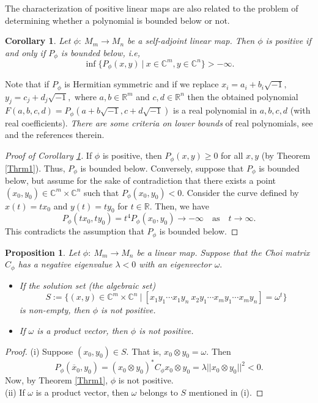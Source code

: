 \documentclass[12pt,a4paper]{amsart}
\theoremstyle{plain}
\newtheorem{corollary}[theorem]{Corollary}
\newtheorem{proposition}[theorem]{Proposition}
\theoremstyle{remark}
\theoremstyle{definition}
\def \R {\mathbb{R}}
\def \C {\mathbb{C}}
\begin{document}
The characterization of positive linear maps are also related to the problem of determining whether a polynomial is bounded below or not. 
\begin{corollary}\label{lowerbound}
	Let $\phi :\ M_m \longrightarrow M_n $ be a self-adjoint linear map. Then $\phi$ is positive if and only if $P_{\phi}$ is bounded below, i.e, 
	$$\inf\{ P_{\phi}(x,y)  \ | \ x\in \C^m, y\in \C^n \} > -\infty. $$
\end{corollary}
Note that if $P_{\phi} $ is Hermitian symmetric and if we replace $x_i= a_i+ b_i\sqrt{-1},$ $y_j=c_j + d_j \sqrt{-1},$ where $a,b \in \R^m$ and $c,d \in \R^n$ then the obtained polynomial $F(a,b,c,d) = P_{\phi}(a+b\sqrt{-1}, c+d \sqrt{-1})$ is a real polynomial in $a,b,c,d$ (with real coefficients). \textit{There are some criteria on lower bounds} of real polynomials, see \cite{Marshall} and the references therein. 
\begin{proof}[Proof of Corollary \ref{lowerbound}]
	If $\phi$ is positive, then $P_{\phi}(x,y) \ge 0$ for all $x, y$ (by Theorem \ref{Thrm1}). Thus, $P_{\phi}$ is bounded below. Conversely, suppose that $P_{\phi}$ is bounded below, but assume for the sake of contradiction that there exists a point $(x_0,y_0) \in \C^m\times \C^n$ such that $P_{\phi}(x_0,y_0) < 0$. Consider the curve defined by $x(t) = tx_0$ and $y(t) = ty_0$ for $t \in \R$. Then, we have
	$$P_{\phi}(tx_0,ty_0) = t^4 P_{\phi}(x_0,y_0) \to -\infty \quad \text{as} \quad t \to \infty.$$
	This contradicts the assumption that $P_{\phi}$ is bounded below.
\end{proof}

\begin{proposition}\label{producteigenvector}
	Let $\phi :\ M_m \longrightarrow M_n $ be a linear map. Suppose that the Choi matrix $C_{\phi}$ has a negative eigenvalue $\lambda<0$ with an eigenvector $\omega.$ 
	\begin{itemize}
		\item[(i)] If the solution set (the algebraic set)
		$$
		S:= \{(x,y) \in \C^m\times \C^n \ | \ [x_1y_1 \cdots  x_1y_n \ x_2y_1 \cdots x_my_1 \cdots x_my_n] = \omega^t  \}
		$$
		is non-empty, then $\phi$ is not positive.
		\item[(ii)] If $\omega$ is a product vector, then $\phi$ is not positive.
	\end{itemize}
\end{proposition}
\begin{proof}
	(i) Suppose $(x_0,y_0) \in S.$ That is, $x_0\otimes y_0= \omega.$ Then
	$$ 
	P_{\phi}(\overline{x}_0,y_0) = (x_0\otimes y_0)^* C_{\phi} x_0\otimes y_0 = \lambda ||x_0\otimes y_0||^2 <0. 
	$$
	Now, by Theorem \ref{Thrm1}, $\phi$ is not positive.\\
	(ii) If $\omega$ is a product vector, then $\omega$ belongs to $S$ mentioned in (i).
\end{proof}
\end{document}
